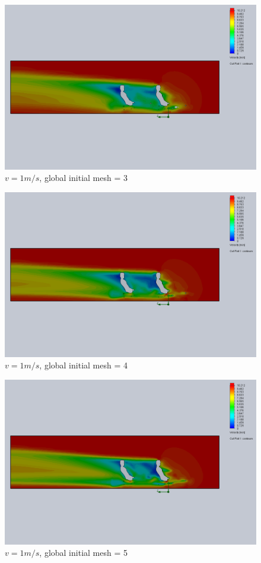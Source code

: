 \documentclass[11pt]{article}
\begin{document}
\begin{figure}
\includegraphics[width=\textwidth]{gm_3_rf_7_v10.png}
\caption{$v = 1 m/s$, global initial mesh = 3}
\end{figure}

\begin{figure}
\includegraphics[width=\textwidth]{gm_4_rf_7_v10.png}
\caption{$v = 1 m/s$, global initial mesh = 4}
\end{figure}

\begin{figure}
\includegraphics[width=\textwidth]{gm_5_rf_7_v10.png}
\caption{$v = 1 m/s$, global initial mesh = 5}
\end{figure}
\end{document}
